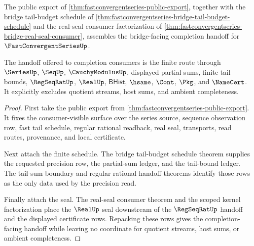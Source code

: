 \begin{theorem}
\label{thm:fastconvergentseries-bridge-completion-handoff}
The public export of \autoref{thm:fastconvergentseries-public-export}, together with the bridge tail-budget schedule of \autoref{thm:fastconvergentseries-bridge-tail-budget-schedule} and the real-seal consumer factorization of \autoref{thm:fastconvergentseries-bridge-real-seal-consumer}, assembles the bridge-facing completion handoff for $\FastConvergentSeriesUp$.

The handoff offered to completion consumers is the finite route through $\SeriesUp$, $\SeqUp$, $\CauchyModulusUp$, displayed partial sums, finite tail bounds, $\RegSeqRatUp$, $\RealUp$, $\mathsf{BHist}$, $\hsame$, $\Cont$, $\Pkg$, and $\NameCert$. It explicitly excludes quotient streams, host sums, and ambient completeness.
\end{theorem}
\begin{proof}
First take the public export from \autoref{thm:fastconvergentseries-public-export}. It fixes the consumer-visible surface over the series source, sequence observation row, fast tail schedule, regular rational readback, real seal, transports, read routes, provenance, and local certificate.

Next attach the finite schedule. The bridge tail-budget schedule theorem supplies the requested precision row, the partial-sum ledger, and the tail-bound ledger. The tail-sum boundary and regular rational handoff theorems identify those rows as the only data used by the precision read.

Finally attach the seal. The real-seal consumer theorem and the scoped kernel factorization place the $\RealUp$ seal downstream of the $\RegSeqRatUp$ handoff and the displayed certificate rows. Repacking these rows gives the completion-facing handoff while leaving no coordinate for quotient streams, host sums, or ambient completeness.
\end{proof}

